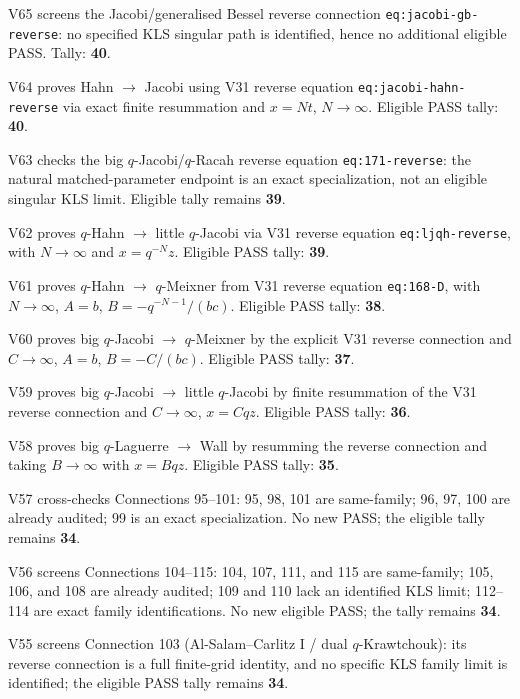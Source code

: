 \documentclass[11pt]{article}
\begin{document}
\noindent V65 screens the Jacobi/generalised Bessel reverse connection \texttt{eq:jacobi-gb-reverse}: no specified KLS singular path is identified, hence no additional eligible PASS. Tally: \textbf{40}.\par
\noindent V64 proves Hahn $\to$ Jacobi using V31 reverse equation \texttt{eq:jacobi-hahn-reverse} via exact finite resummation and $x=Nt$, $N\to\infty$. Eligible PASS tally: \textbf{40}.\par
\noindent V63 checks the big $q$-Jacobi/$q$-Racah reverse equation \texttt{eq:171-reverse}: the natural matched-parameter endpoint is an exact specialization, not an eligible singular KLS limit. Eligible tally remains \textbf{39}.\par
\noindent V62 proves $q$-Hahn $\to$ little $q$-Jacobi via V31 reverse equation \texttt{eq:ljqh-reverse}, with $N\to\infty$ and $x=q^{-N}z$. Eligible PASS tally: \textbf{39}.\par
\noindent V61 proves $q$-Hahn $\to$ $q$-Meixner from V31 reverse equation \texttt{eq:168-D}, with $N\to\infty$, $A=b$, $B=-q^{-N-1}/(bc)$. Eligible PASS tally: \textbf{38}.\par
\noindent V60 proves big $q$-Jacobi $\to$ $q$-Meixner by the explicit V31 reverse connection and $C\to\infty$, $A=b$, $B=-C/(bc)$. Eligible PASS tally: \textbf{37}.\par
\noindent V59 proves big $q$-Jacobi $\to$ little $q$-Jacobi by finite resummation of the V31 reverse connection and $C\to\infty$, $x=Cqz$. Eligible PASS tally: \textbf{36}.\par
\noindent V58 proves big $q$-Laguerre $\to$ Wall by resumming the reverse connection and taking $B\to\infty$ with $x=Bqz$. Eligible PASS tally: \textbf{35}.\par
\noindent V57 cross-checks Connections 95--101: 95, 98, 101 are same-family; 96, 97, 100 are already audited; 99 is an exact specialization. No new PASS; the eligible tally remains \textbf{34}.\par
\noindent V56 screens Connections 104--115: 104, 107, 111, and 115 are same-family; 105, 106, and 108 are already audited; 109 and 110 lack an identified KLS limit; 112--114 are exact family identifications. No new eligible PASS; the tally remains \textbf{34}.\par
\noindent V55 screens Connection 103 (Al-Salam--Carlitz I / dual $q$-Krawtchouk): its reverse connection is a full finite-grid identity, and no specific KLS family limit is identified; the eligible PASS tally remains \textbf{34}.\par
\end{document}
